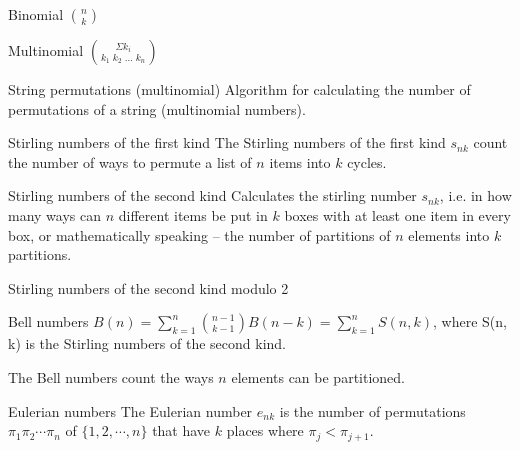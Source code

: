 

\begin{algorithm}{Binomial $\binom{n}{k}$}
\end{algorithm}

\begin{algorithm}{Multinomial $\binom{\Sigma k_i}{k_1\;k_2\;\ldots\;k_n}$}
\end{algorithm}

\begin{algorithm}{String permutations (multinomial)}
\desc
Algorithm for calculating the number of permutations of a string
(multinomial numbers).
\end{algorithm}

\begin{algorithm}{Stirling numbers of the first kind}
\desc
The Stirling numbers of the first kind $s_{nk}$ count the number of
ways to permute a list of $n$ items into $k$ cycles.
\end{algorithm}

\begin{algorithm}{Stirling numbers of the second kind}
\desc
Calculates the stirling number $s_{nk}$, i.e. in how many ways can $n$
different items be put in $k$ boxes with at least one item in every
box, or mathematically speaking -- the number of partitions of $n$
elements into $k$ partitions.
\end{algorithm}

\begin{algorithm}{Stirling numbers of the second kind modulo 2}
\end{algorithm}


\begin{algorithm}{Bell numbers}
\desc
$B(n) = \sum_{k=1}^n \binom{n-1}{k-1} B(n-k) = \sum_{k=1}^n S(n,k)$,
where S(n, k) is the Stirling numbers of the second kind.

The Bell numbers count the ways $n$ elements can be partitioned.
\end{algorithm}

\begin{algorithm}{Eulerian numbers}
\desc
The Eulerian number $e_{nk}$ is the number of permutations $\pi_1
\pi_2 \cdots \pi_n$ of $\{1,2,\cdots,n\}$ that have $k$ places where
$\pi_j < \pi_{j+1}$.
\end{algorithm}

